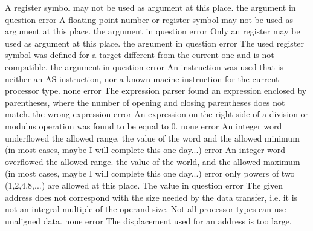 \documentclass[12pt,twoside]{report}
\begin{document}
\begin{description}
               {A register symbol may not be used as argument at this place.}
               {the argument in question}
               {error}
               {A floating point number or register symbol may not be used as argument at this place.}
               {the argument in question}
               {error}
               {Only an register may be used as argument at this place.}
               {the argument in question}
               {error}
               {The used register symbol was defined for a target different from
                the current one and is not compatible.}
               {the argument in question}
               {error}
               {An instruction was used that is neither an AS instruction, nor a
                known macine instruction for the current processor type.}
               {none}
               {error}
               {The expression parser found an expression enclosed by
                parentheses, where the number of opening and closing
                parentheses does not match.}
               {the wrong expression}
               {error}
               {An expression on the right side of a division or modulus
                operation was found to be equal to 0.}
               {none}
               {error}
               {An integer word underflowed the allowed range.}
               {the value of the word and the allowed minimum (in most
                cases, maybe I will complete this one day...)}
               {error}
               {An integer word overflowed the allowed range.}
               {the value of the world, and the allowed maximum (in most
                cases, maybe I will complete this one day...)}
               {error}
               {only powers of two (1,2,4,8,...) are allowed at this place.}
               {The value in question}
               {error}
               {The given address does not correspond with the size needed
                by the data transfer, i.e. it is not an integral multiple of
                the operand size. Not all processor types can use unaligned
                data.}
               {none}
               {error}
               {The displacement used for an address is too large.}

\end{description}
\end{document}
